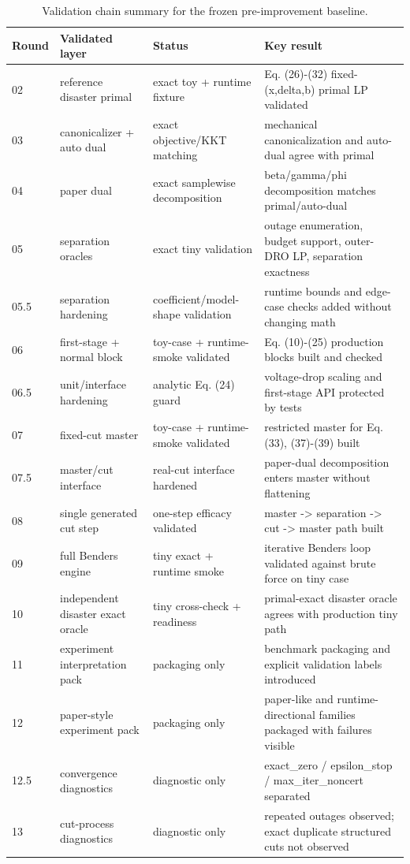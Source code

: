 \begin{table}[htbp]
\centering
\footnotesize
\setlength{\tabcolsep}{4pt}
\renewcommand{\arraystretch}{1.12}
\caption{Validation chain summary for the frozen pre-improvement baseline.}
\label{tab:validation-chain-summary}
\begin{tabular}{p{0.8cm} p{3.0cm} p{3.0cm} p{7.0cm}}
\hline
Round & Validated layer & Status & Key result \\
\hline
02 & reference disaster primal & exact toy + runtime fixture & Eq. (26)-(32) fixed-(x,delta,b) primal LP validated \\
03 & canonicalizer + auto dual & exact objective/KKT matching & mechanical canonicalization and auto-dual agree with primal \\
04 & paper dual & exact samplewise decomposition & beta/gamma/phi decomposition matches primal/auto-dual \\
05 & separation oracles & exact tiny validation & outage enumeration, budget support, outer-DRO LP, separation exactness \\
05.5 & separation hardening & coefficient/model-shape validation & runtime bounds and edge-case checks added without changing math \\
06 & first-stage + normal block & toy-case + runtime-smoke validated & Eq. (10)-(25) production blocks built and checked \\
06.5 & unit/interface hardening & analytic Eq. (24) guard & voltage-drop scaling and first-stage API protected by tests \\
07 & fixed-cut master & toy-case + runtime-smoke validated & restricted master for Eq. (33), (37)-(39) built \\
07.5 & master/cut interface & real-cut interface hardened & paper-dual decomposition enters master without flattening \\
08 & single generated cut step & one-step efficacy validated & master -> separation -> cut -> master path built \\
09 & full Benders engine & tiny exact + runtime smoke & iterative Benders loop validated against brute force on tiny case \\
10 & independent disaster exact oracle & tiny cross-check + readiness & primal-exact disaster oracle agrees with production tiny path \\
11 & experiment interpretation pack & packaging only & benchmark packaging and explicit validation labels introduced \\
12 & paper-style experiment pack & packaging only & paper-like and runtime-directional families packaged with failures visible \\
12.5 & convergence diagnostics & diagnostic only & exact\_zero / epsilon\_stop / max\_iter\_noncert separated \\
13 & cut-process diagnostics & diagnostic only & repeated outages observed; exact duplicate structured cuts not observed \\
\hline
\end{tabular}
\end{table}
